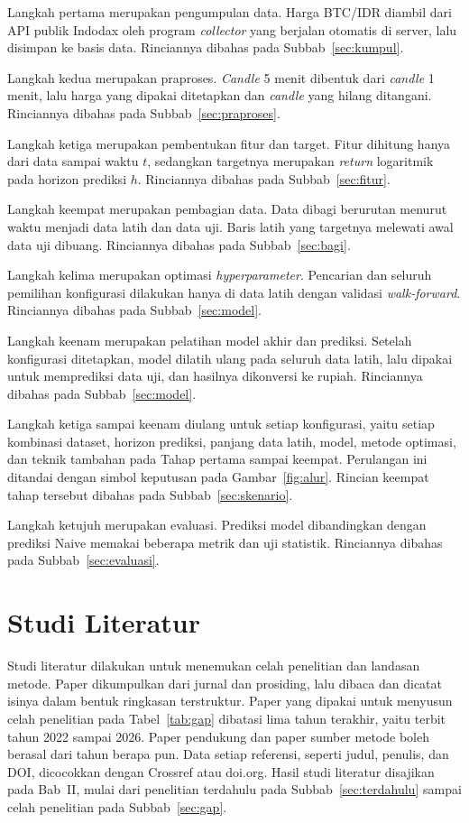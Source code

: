 Langkah pertama merupakan pengumpulan data. Harga BTC/IDR diambil dari API
publik Indodax oleh program \textit{collector} yang berjalan otomatis di
server, lalu disimpan ke basis data. Rinciannya dibahas pada
Subbab~\ref{sec:kumpul}.

Langkah kedua merupakan praproses. \textit{Candle} 5 menit dibentuk dari
\textit{candle} 1 menit, lalu harga yang dipakai ditetapkan dan
\textit{candle} yang hilang ditangani. Rinciannya dibahas pada Subbab~\ref{sec:praproses}.

Langkah ketiga merupakan pembentukan fitur dan target. Fitur dihitung hanya
dari data sampai waktu $t$, sedangkan targetnya merupakan \textit{return}
logaritmik pada horizon prediksi $h$. Rinciannya dibahas pada
Subbab~\ref{sec:fitur}.

Langkah keempat merupakan pembagian data. Data dibagi berurutan menurut waktu
menjadi data latih dan data uji. Baris latih yang targetnya melewati awal
data uji dibuang. Rinciannya dibahas pada
Subbab~\ref{sec:bagi}.

Langkah kelima merupakan optimasi \textit{hyperparameter}. Pencarian dan
seluruh pemilihan konfigurasi dilakukan hanya di data latih dengan
validasi \textit{walk-forward}. Rinciannya dibahas pada
Subbab~\ref{sec:model}.

Langkah keenam merupakan pelatihan model akhir dan prediksi. Setelah
konfigurasi ditetapkan, model dilatih ulang pada seluruh data latih, lalu
dipakai untuk memprediksi data uji, dan hasilnya dikonversi ke rupiah.
Rinciannya dibahas pada Subbab~\ref{sec:model}.

Langkah ketiga sampai keenam diulang untuk setiap konfigurasi, yaitu setiap
kombinasi dataset, horizon prediksi, panjang data latih, model, metode
optimasi, dan teknik tambahan pada Tahap pertama sampai keempat. Perulangan
ini ditandai dengan simbol keputusan pada Gambar~\ref{fig:alur}. Rincian
keempat tahap tersebut dibahas pada Subbab~\ref{sec:skenario}.

Langkah ketujuh merupakan evaluasi. Prediksi model dibandingkan dengan prediksi
Naive memakai beberapa metrik dan uji statistik. Rinciannya dibahas pada
Subbab~\ref{sec:evaluasi}.

\section{Studi Literatur}
\label{sec:literatur}
Studi literatur dilakukan untuk menemukan celah penelitian dan landasan
metode. Paper dikumpulkan dari jurnal dan prosiding, lalu dibaca dan dicatat
isinya dalam bentuk ringkasan terstruktur. Paper yang dipakai untuk menyusun
celah penelitian pada Tabel~\ref{tab:gap} dibatasi lima tahun terakhir, yaitu
terbit tahun 2022 sampai 2026. Paper pendukung dan paper sumber metode boleh
berasal dari tahun berapa pun. Data setiap referensi, seperti judul, penulis, dan DOI, dicocokkan dengan Crossref atau doi.org. Hasil studi literatur disajikan pada Bab~II,
mulai dari penelitian terdahulu pada Subbab~\ref{sec:terdahulu} sampai celah
penelitian pada Subbab~\ref{sec:gap}.

